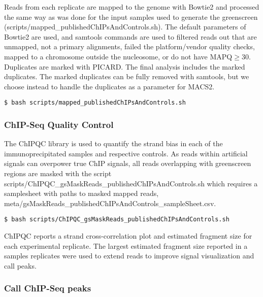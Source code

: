 \documentclass{article}
\begin{document}
\begin{sloppypar}
Reads from each replicate are mapped to the genome with Bowtie2 and processed the same way as was done for the input samples used to generate the greenscreen ({\selectfont scripts/mapped\_publishedChIPsAndControls.sh}). The default parameters of Bowtie2 are used, and samtools commands are used to filtered reads out that are unmapped, not a primary alignments, failed the platform/vendor quality checks, mapped to a chromosome outside the nucleosome, or do not have MAPQ$\geq$30. Duplicates are marked with PICARD. The final analysis includes the marked duplicates. The marked duplicates can be fully removed with samtools, but we choose instead to handle the duplicates as a parameter for MACS2.

\begin{verbatim}
$ bash scripts/mapped_publishedChIPsAndControls.sh
\end{verbatim}

\subsubsection{ChIP-Seq Quality Control}

The ChIPQC library is used to quantify the strand bias in each of the immunoprecipitated samples and respective controls. As reads within artificial signals can overpower true ChIP signals, all reads overlapping with greenscreen regions are masked with the script {\selectfont scripts/ChIPQC\_gsMaskReads\_publishedChIPsAndControls.sh} which requires a samplesheet with paths to masked mapped reads, {\selectfont meta/gsMaskReads\_publishedChIPsAndControls\_sampleSheet.csv}.

\begin{verbatim}
$ bash scripts/ChIPQC_gsMaskReads_publishedChIPsAndControls.sh
\end{verbatim}

ChIPQC reports a strand cross-correlation plot and estimated fragment size for each experimental replicate. The largest estimated fragment size reported in a samples replicates were used to extend reads to improve signal visualization and call peaks.

\subsubsection{Call ChIP-Seq peaks}


\end{sloppypar}
\end{document}

